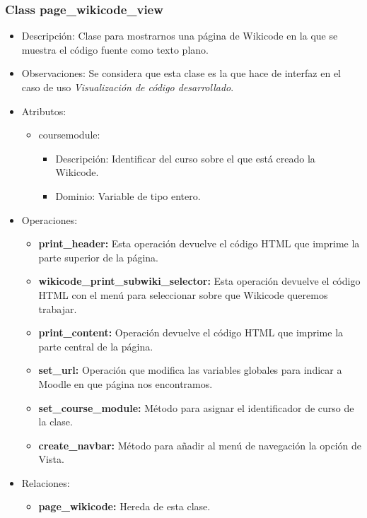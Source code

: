 \subsubsection{Class page\_wikicode\_view}

\begin{itemize}
	\item Descripción: Clase para mostrarnos una página de Wikicode en la que se muestra el código fuente como texto plano.
	\item Observaciones: Se considera que esta clase es la que hace de interfaz en el caso de uso \emph{Visualización de código desarrollado}.
	\item Atributos:
		\begin{itemize}
			\item coursemodule:
				\begin{itemize}
					\item Descripción: Identificar del curso sobre el que está creado la Wikicode.
					\item Dominio: Variable de tipo entero.
				\end{itemize}
		\end{itemize}
	\item Operaciones:
		\begin{itemize}
			\item \textbf{print\_header: }Esta operación devuelve el código HTML que imprime la parte superior de la página.
			\item \textbf{wikicode\_print\_subwiki\_selector: }Esta operación devuelve el código HTML con el menú para seleccionar sobre que Wikicode queremos trabajar.
			\item \textbf{print\_content: }Operación devuelve el código HTML que imprime la parte central de la página.
			\item \textbf{set\_url: }Operación que modifica las variables globales para indicar a Moodle en que página nos encontramos.
			\item \textbf{set\_course\_module: }Método para asignar el identificador de curso de la clase.
			\item \textbf{create\_navbar: }Método para añadir al menú de navegación la opción de Vista.
		\end{itemize}
	\item Relaciones:
		\begin{itemize}
			\item \textbf{page\_wikicode:} Hereda de esta clase.
		\end{itemize}
	\newpage

\end{itemize}
